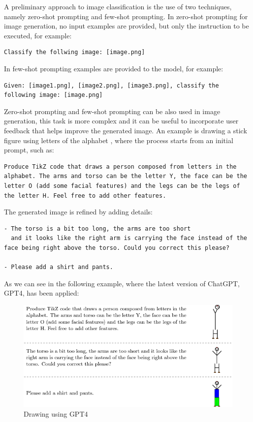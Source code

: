 A preliminary approach to image classification is the use of two techniques, namely zero-shot prompting and few-shot prompting. \cite{chen2023unleashing} In zero-shot prompting for image generation, no input examples are provided, but only the instruction to be executed, for example:
\begin{lstlisting}
Classify the follwing image: [image.png]
\end{lstlisting}
In few-shot prompting examples are provided to the model, for example:
\begin{lstlisting}
Given: [image1.png], [image2.png], [image3.png], classify the following image: [image.png]
\end{lstlisting}
Zero-shot prompting and few-shot prompting can be also used in image generation, this task is more complex and it can be useful to incorporate user feedback that helps improve the generated image. An example is drawing a stick figure using letters of the alphabet \cite{proptingguide_image}, where the process starts from an initial prompt, such as:
\begin{lstlisting}
Produce TikZ code that draws a person composed from letters in the alphabet. The arms and torso can be the letter Y, the face can be the letter O (add some facial features) and the legs can be the legs of the letter H. Feel free to add other features.    
\end{lstlisting}
The generated image is refined by adding details: 
\begin{lstlisting}
- The torso is a bit too long, the arms are too short 
  and it looks like the right arm is carrying the face instead of the face being right above the torso. Could you correct this please? 

- Please add a shirt and pants.
\end{lstlisting}
As we can see in the following example, where the latest version of ChatGPT, GPT4, has been applied:
\begin{figure}[H]
    \centering
    \includegraphics[width=0.8\linewidth]{Figures/fig_10.png}
    \caption{Drawing using GPT4}
\end{figure}
